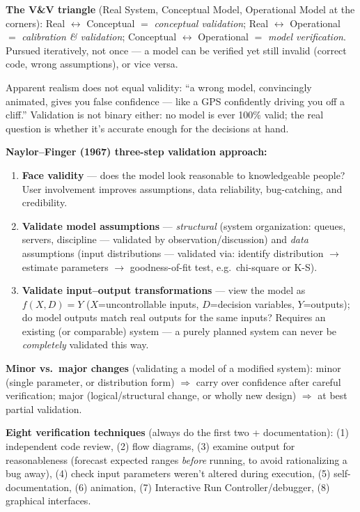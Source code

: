 \textbf{The V\&V triangle} (Real System, Conceptual Model, Operational Model at the corners): Real $\leftrightarrow$ Conceptual $=$ \emph{conceptual validation}; Real $\leftrightarrow$ Operational $=$ \emph{calibration \& validation}; Conceptual $\leftrightarrow$ Operational $=$ \emph{model verification}. Pursued iteratively, not once — a model can be verified yet still invalid (correct code, wrong assumptions), or vice versa.

\begin{keypoint}
Apparent realism does not equal validity: ``a wrong model, convincingly animated, gives you false confidence — like a GPS confidently driving you off a cliff.'' Validation is not binary either: no model is ever 100\% valid; the real question is whether it's accurate enough for the decisions at hand.
\end{keypoint}

\textbf{Naylor--Finger (1967) three-step validation approach:}
\begin{enumerate}
\item \textbf{Face validity} — does the model look reasonable to knowledgeable people? User involvement improves assumptions, data reliability, bug-catching, and credibility.
\item \textbf{Validate model assumptions} — \emph{structural} (system organization: queues, servers, discipline — validated by observation/discussion) and \emph{data} assumptions (input distributions — validated via: identify distribution $\to$ estimate parameters $\to$ goodness-of-fit test, e.g.\ chi-square or K-S).
\item \textbf{Validate input--output transformations} — view the model as $f(X,D)=Y$ ($X$=uncontrollable inputs, $D$=decision variables, $Y$=outputs); do model outputs match real outputs for the same inputs? Requires an existing (or comparable) system — a purely planned system can never be \emph{completely} validated this way.
\end{enumerate}

\textbf{Minor vs.\ major changes} (validating a model of a modified system): minor (single parameter, or distribution form) $\Rightarrow$ carry over confidence after careful verification; major (logical/structural change, or wholly new design) $\Rightarrow$ at best partial validation.

\textbf{Eight verification techniques} (always do the first two + documentation): (1) independent code review, (2) flow diagrams, (3) examine output for reasonableness (forecast expected ranges \emph{before} running, to avoid rationalizing a bug away), (4) check input parameters weren't altered during execution, (5) self-documentation, (6) animation, (7) Interactive Run Controller/debugger, (8) graphical interfaces.

